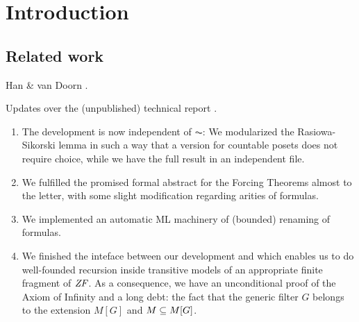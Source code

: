 \section{Introduction}
\label{sec:introduction}

\subsection{Related work}

Han \& van Doorn \cite{han_et_al:LIPIcs:2019:11074}.

Updates over the (unpublished) technical report \cite{2019arXiv190103313G}.

\begin{enumerate}
\item The development is now independent of $\AC$: We modularized the
  Rasiowa-Sikorski lemma in such a way that a version for countable
  posets does not require choice, while we have the full result in an
  independent file.
\item We fulfilled the promised formal abstract for the Forcing
  Theorems almost to the letter, with some slight modification
  regarding arities of formulas.
\item We implemented an automatic ML machinery of (bounded) renaming
  of formulas.
\item We finished the inteface between our development and
   which enables us to do well-founded
  recursion inside transitive models of an appropriate finite fragment
  of $\mathit{ZF}$. As a consequence, we have an unconditional proof of
  the Axiom of Infinity and a long debt: the fact that the generic
  filter $G$ belongs to the extension $M[G]$ and $M\subseteq M[G]$.
\end{enumerate}
